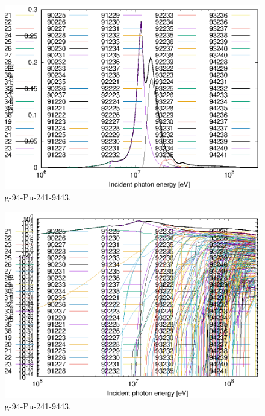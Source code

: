 \begin{figure}
 \includegraphics[width=\linewidth]{eps/g_94-Pu-241_9443.eps}
  \caption{g-94-Pu-241-9443.}
\end{figure}
\begin{figure}
 \includegraphics[width=\linewidth]{eps-log/g_94-Pu-241_9443.eps}
 \caption{g-94-Pu-241-9443.}
\end{figure}
\newpage \clearpage

